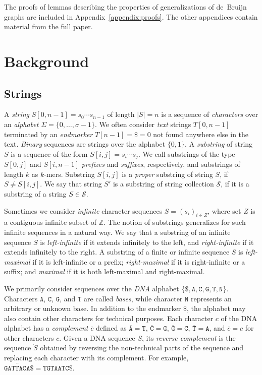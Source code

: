 \documentclass[a4paper,UKenglish]{lipics-v2016}
\newcommand{\set}[1]{\ensuremath{\{ #1 \}}}
\newcommand{\abs}[1]{\ensuremath{\lvert #1 \rvert}}
\newcommand{\dnaseq}[1]{\ensuremath{\mathtt{#1}}}
\newcommand{\baseA}{\dnaseq{A}}
\newcommand{\baseC}{\dnaseq{C}}
\newcommand{\baseG}{\dnaseq{G}}
\newcommand{\baseT}{\dnaseq{T}}
\newcommand{\baseN}{\dnaseq{N}}
\newcommand{\dnacomp}[1]{\ensuremath{\overline{#1}}}
\newcommand{\revcomp}[1]{\ensuremath{\overleftarrow{#1}}}
\newcommand{\kmer}[1]{$#1$\nobreakdash-mer}
\begin{document}
The proofs of lemmas describing the properties of generalizations of de~Bruijn graphs are included in Appendix~\ref{appendix:proofs}. The other appendices contain material from the full paper.


\section{Background}

\subsection{Strings}\label{sect:strings}

A \emph{string} $S[0, n-1] = s_{0} \dotsm s_{n-1}$ of length $\abs{S} = n$ is a sequence of \emph{characters} over an \emph{alphabet} $\Sigma = \set{0, \dotsc, \sigma - 1}$. We often consider \emph{text} strings $T[0, n-1]$ terminated by an \emph{endmarker} $T[n-1] = \$ = 0$ not found anywhere else in the text. \emph{Binary} sequences are strings over the alphabet $\set{0, 1}$. A \emph{substring} of string $S$ is a sequence of the form $S[i, j] = s_{i} \dotsm s_{j}$. We call substrings of the type $S[0, j]$ and $S[i, n-1]$ \emph{prefixes} and \emph{suffixes}, respectively, and substrings of length $k$ as \kmer{k}s. Substring $S[i, j]$ is a \emph{proper} substring of string $S$, if $S \ne S[i, j]$. We say that string $S'$ is a substring of string collection $\mathcal{S}$, if it is a substring of a string $S \in \mathcal{S}$.

Sometimes we consider \emph{infinite} character sequences $S = (s_{i})_{i \in Z}$, where set $Z$ is a contiguous infinite subset of $\mathbb{Z}$. The notion of substrings generalizes for such infinite sequences in a natural way. We say that a substring of an infinite sequence $S$ is \emph{left-infinite} if it extends infinitely to the left, and \emph{right-infinite} if it extends infinitely to the right. A substring of a finite or infinite sequence $S$ is \emph{left-maximal} if it is left-infinite or a prefix; \emph{right-maximal} if it is right-infinite or a suffix; and \emph{maximal} if it is both left-maximal and right-maximal.

We primarily consider sequences over the \emph{DNA} alphabet $\set{\$, \baseA, \baseC, \baseG, \baseT, \baseN}$. Characters $\baseA$, $\baseC$, $\baseG$, and $\baseT$ are called \emph{bases}, while character $\baseN$ represents an arbitrary or unknown base. In addition to the endmarker $\$$, the alphabet may also contain other characters for technical purposes. Each character $c$ of the DNA alphabet has a \emph{complement} $\dnacomp{c}$ defined as $\dnacomp{\baseA} = \baseT$, $\dnacomp{\baseC} = \baseG$, $\dnacomp{\baseG} = \baseC$, $\dnacomp{\baseT} = \baseA$, and $\dnacomp{c} = c$ for other characters $c$. Given a DNA sequence $S$, its \emph{reverse complement} is the sequence $\revcomp{S}$ obtained by reversing the non-technical parts of the sequence and replacing each character with its complement. For example, $\revcomp{\dnaseq{GATTACA}\$} = \dnaseq{TGTAATC}\$$.
\end{document}
